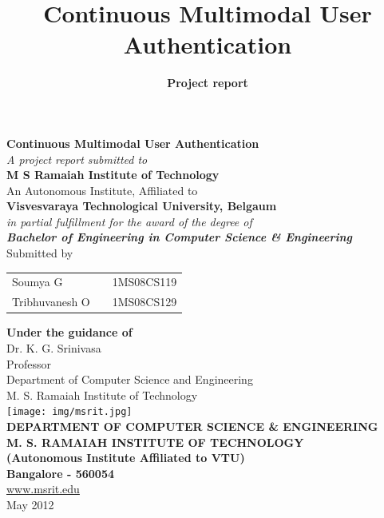 \documentclass[12pt]{article}			%
\title{Continuous Multimodal User Authentication}	%
\author{{\bf Project report}{\bf}}
\date{}				%
\begin{document}

\begin{singlespacing}
\thispagestyle{empty}			%

\begin{center}

\thisfancypage{%
\setlength{\fboxsep}{9pt}%
\setlength{\shadowsize}{8pt}%
\doublebox}{}
\textbf{\Large Continuous Multimodal User Authentication}\\[4ex]
\textit{\large A project report submitted to}\\[2ex]
\textbf{\Large M S Ramaiah Institute of Technology}\\[2ex]
An Autonomous Institute, Affiliated to\\[2ex]
\textbf{Visvesvaraya Technological University, Belgaum}\\[2ex]
\textit{in partial fulfillment for the award of the degree of}\\[2ex]
\textbf{\textit{\large Bachelor of Engineering in Computer Science \& Engineering}}\\[4ex]
Submitted by\\[2ex]
\begin{table}[htp]
	\centering
	\begin{tabular}{lcc}
	Soumya G       &  \hspace{20 mm} & 1MS08CS119             \\
	Tribhuvanesh O &  \hspace{20 mm} & 1MS08CS129             \\ 
	\end{tabular}
\end{table}

{\bf Under the guidance of }{\bf}\\[2ex]
Dr. K. G. Srinivasa\\
Professor\\
Department of Computer Science and Engineering\\
M. S. Ramaiah Institute of Technology\\[3ex]


\texttt{[image: img/msrit.jpg]}\\
\uppercase{\textbf{Department of Computer Science \& Engineering}}\\[2ex]
\uppercase{\textbf{M. S. Ramaiah Institute of Technology}}\\
\textbf{(Autonomous Institute Affiliated to VTU)}\\
\textbf{Bangalore - 560054}\\
\url{www.msrit.edu}\\
{May 2012}
\end{center}
\end{singlespacing}
\newpage
\end{document}
